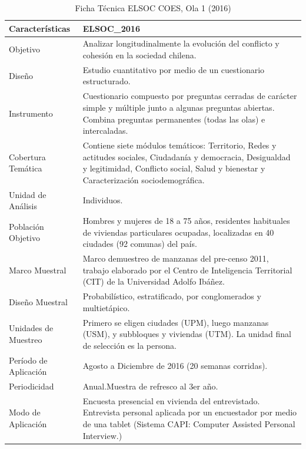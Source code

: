\documentclass[
]{book}
\begin{document}
\begin{landscape}\begin{table}

\caption{\label{tab:unnamed-chunk-2}\label{tab:apaisada}Ficha Técnica ELSOC COES, Ola 1 (2016)}
\centering
\begin{tabular}[t]{>{\raggedright\arraybackslash}p{2cm}>{\raggedright\arraybackslash}p{6cm}}
\toprule
Características & ELSOC\_2016\\
\midrule
Objetivo & Analizar longitudinalmente la evolución del conflicto y cohesión
                              en la sociedad chilena.\\
Diseño & Estudio cuantitativo por medio de un cuestionario estructurado.\\
Instrumento & Cuestionario compuesto por preguntas cerradas de carácter simple
            y múltiple junto a algunas preguntas abiertas. Combina preguntas
            permanentes (todas las olas) e intercaladas.\\
Cobertura Temática & Contiene siete módulos temáticos: Territorio, Redes y actitudes
          sociales, Ciudadanía y democracia, Desigualdad y legitimidad,
          Conflicto social, Salud y bienestar y Caracterización sociodemográfica.\\
Unidad de Análisis & Individuos.\\
\addlinespace
Población Objetivo & Hombres y mujeres de 18 a 75 años, residentes habituales de viviendas
              particulares ocupadas, localizadas en 40 ciudades (92 comunas) del país.\\
Marco Muestral & Marco demuestreo de manzanas del pre-censo 2011, trabajo elaborado
            por el Centro de Inteligencia Territorial (CIT) de la Universidad Adolfo Ibáñez.\\
Diseño Muestral & Probabilístico, estratificado, por conglomerados y multietápico.\\
Unidades de Muestreo & Primero se eligen ciudades (UPM), luego manzanas (USM), y subbloques
              y viviendas (UTM). La unidad final de selección es la persona.\\
Período de Aplicación & Agosto a Diciembre de 2016 (20 semanas corridas).\\
\addlinespace
Periodicidad & Anual.Muestra de refresco al 3er año.\\
Modo de Aplicación & Encuesta presencial en vivienda del entrevistado. Entrevista personal
            aplicada por un encuestador por medio de una tablet (Sistema CAPI:
            Computer Assisted Personal Interview.)\\

\end{tabular}
\end{table}
\end{landscape}
\end{document}
